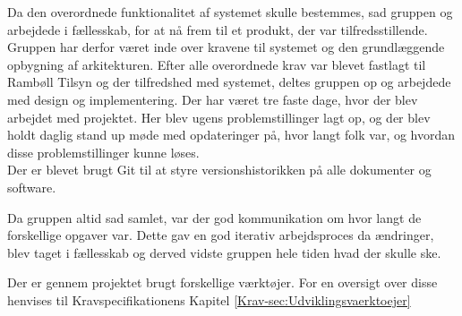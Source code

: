 Da den overordnede funktionalitet af systemet skulle bestemmes, sad gruppen og arbejdede i fællesskab, for at nå frem til et produkt, der var tilfredsstillende. Gruppen har derfor været inde over kravene til systemet og den grundlæggende opbygning af arkitekturen.
Efter alle overordnede krav var blevet fastlagt til Rambøll Tilsyn og der tilfredshed med systemet, deltes gruppen op og arbejdede med design og implementering.
Der har været tre faste dage, hvor der blev arbejdet med projektet. Her blev ugens problemstillinger lagt op, og der blev holdt daglig stand up møde med opdateringer på, hvor langt folk var, og hvordan disse problemstillinger kunne løses. \\
Der er blevet brugt Git til at styre versionshistorikken på alle dokumenter og software. 

Da gruppen altid sad samlet, var der god kommunikation om hvor langt de forskellige opgaver var.
Dette gav en god iterativ arbejdsproces da ændringer, blev taget i fællesskab og derved vidste gruppen hele tiden hvad der skulle ske.

Der er gennem projektet brugt forskellige værktøjer. For en oversigt over disse henvises til Kravspecifikationens Kapitel \ref{Krav-sec:Udviklingsvaerktoejer}
